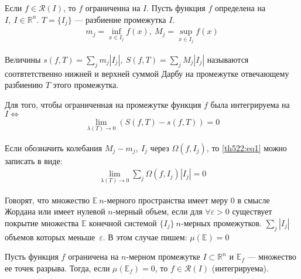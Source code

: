 \begin{theorem}
  Если $f \in \mathcal{R}(I)$, то $f$ ограниченна на $I$.
  Пусть функция $f$ определена на $I, \ I \in \mathbb{R}^n$. $T = \{I_j\}$ ---
  разбиение промежутка $I$.
  \begin{gather*}
    m_j = \inf\limits_{x \in I_j} f(x), \ M_j = \sup\limits_{x \in I_j} f(x)
  \end{gather*}
\end{theorem}

\begin{definition}
  Величины $s(f, T) = \sum\limits_{j} m_j |I_j|, \ S(f,T) = \sum\limits_{j} M_j
  |I_j|$ называются соотвтетственно нижней и верхней суммой Дарбу на промежутке
  отвечающему разбиению $T$ этого промежутка.
\end{definition}

\begin{comment}
  Совершенно аналогично доказывается при $m = 1$ теорема \eqref{th522}.
\end{comment}

\begin{theorem}
  \label{th522}
  Для того, чтобы ограниченная на промежутке функция $f$ была интегрируема на
  $I \Longleftrightarrow$
  \begin{gather}
    \lim\limits_{\lambda(T) \to 0} (S(f, T) - s(f, T)) = 0
    \label{th522:eq1}
  \end{gather}
\end{theorem}

\begin{remark}
  Если обозначить колебания $M_j - m_j, \ I_j$ через $\Omega(f, I_j)$, то
  \eqref{th522:eq1} можно записать в виде:
  \begin{gather*}
    \lim\limits_{\lambda(T) \to 0} \sum\limits_{j} \Omega(f, I_j) |I_j| = 0
  \end{gather*}
\end{remark}

\begin{definition}
  Говорят, что множество $\mathbb{E} \ n$-мерного пространства имеет меру $0$ в
  смысле Жордана или имеет нулевой $n$-мерный объем, если для $\forall
  \varepsilon > 0$ существует покрытие множества $\mathbb{E}$ конечной системой
  $\{I_j\} \ n$-мерных промежутков. $\sum\limits_{j} |I_j|$ объемов которых
  меньше~$\varepsilon$. В этом случае пишем: $\mu(\mathbb{E}) = 0$
\end{definition}

\begin{theorem}
  \label{th523}
  Пусть функция $f$ ограничена на $n$-мерном промежутке $I \subset
  \mathbb{R}^n$ и $\mathbb{E}_f$ --- множество ее точек разрыва. Тогда, если
  $\mu(\mathbb{E}_f) = 0$, то $f \in \mathcal{R}(I)$ (интегрируема).
\end{theorem}

